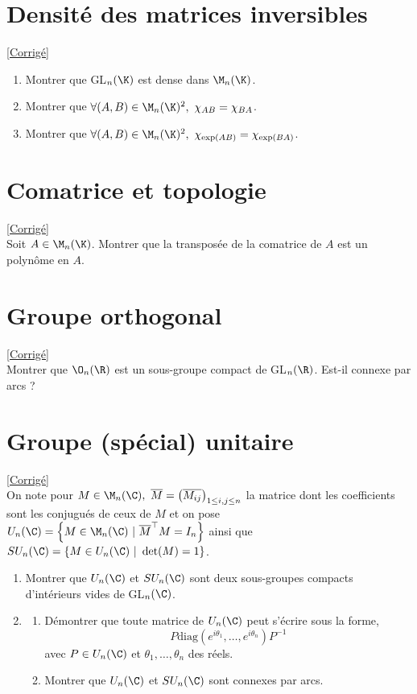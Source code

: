 \documentclass{book}
\begin{document}
\section{Densité des matrices inversibles }
\label{Densité des matrices inversibles}
\textcolor{blue}{\hyperref[sec:densite-des-matrices-inversibles-etoile3]{[Corrigé]}}\\
\begin{enumerate}[leftmargin=*]
	\item Montrer que GL$_n(\K)$ est dense dans $\M_n(\K)$.
	\item Montrer que $\forall (A,B)\in \M_n(\K)^2,\ \chi_{AB}=\chi_{BA}$.
	\item Montrer que $\forall (A,B)\in \M_n(\K)^2,\ \chi_{\operatorname{exp}(AB)}=\chi_{\operatorname{exp}(BA)}$.
\end{enumerate}

\section{Comatrice et topologie}
\label{Comatrice et toplogie}
\textcolor{blue}{\hyperref[sec:comatrice-et-topologie]{[Corrigé]}}\\
Soit $A\in \M_n(\K)$. Montrer que la transposée de la comatrice de $A$ est un polynôme en $A$.

\section{Groupe orthogonal }
\label{Groupe orthogonal}
\textcolor{blue}{\hyperref[sec:groupe-orthogonal-etoile1]{[Corrigé]}}\\
Montrer que $\O_n(\R)$ est un sous-groupe compact de GL$_n(\R)$. Est-il connexe par arcs ?

\section{Groupe (spécial) unitaire }
\label{Groupe (spécial) unitaire}
\textcolor{blue}{\hyperref[sec:groupe-special-unitaire-etoile3]{[Corrigé]}}\\
On note pour $M\in \M_n(\C),\ \overline{M}=\left(\overline{M_{ij}}\right)_{1\leq i,j\leq n}$ la matrice dont les coefficients sont les conjugués de ceux de $M$ et on pose $U_n(\C)=\left\{M\in\M_n(\C) \ | \ \overline{M}^\top M=I_n\right\}$ ainsi que $SU_n(\C)=\{M\in U_n(\C) \ | \ \det(M)=1\}$.
\begin{enumerate}
	\item Montrer que $U_n(\C)$ et $SU_n(\C)$ sont deux sous-groupes compacts d'intérieurs vides de GL$_n(\C)$.
	\item \begin{enumerate}[label=\alph*.]
		\item Démontrer que toute matrice de $U_n(\C)$ peut s'écrire sous la forme,
		$$P\text{diag}(e^{i\theta_1},\dots,e^{i\theta_n})P^{-1}$$
		avec $P\in U_n(\C)$ et $\theta_1,\dots,\theta_n$ des réels.\\
		\item Montrer que $U_n(\C)$ et $SU_n(\C)$ sont connexes par arcs.
	\end{enumerate}
\end{enumerate}
\end{document}
